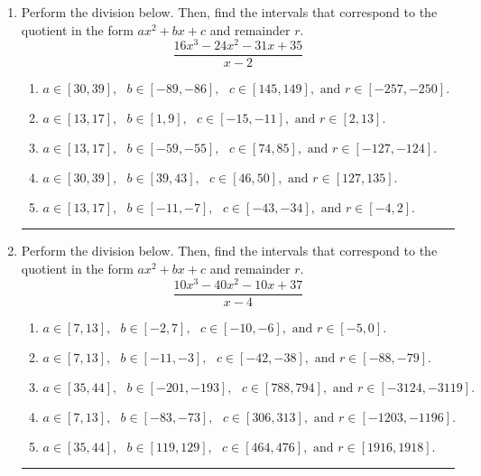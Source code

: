 \documentclass[14pt]{extbook}
\newcommand{\litem}[1]{\item#1\hspace*{-1cm}\rule{\textwidth}{0.4pt}}
\begin{document}
\begin{enumerate}
{\begin{enumerate}[label=\Alph*.]
\end{enumerate} }
\litem{
Perform the division below. Then, find the intervals that correspond to the quotient in the form $ax^2+bx+c$ and remainder $r$.\[ \frac{16x^{3} -24 x^{2} -31 x + 35}{x -2} \]\begin{enumerate}[label=\Alph*.]
\item \( a \in [30, 39], \text{   } b \in [-89, -86], \text{   } c \in [145, 149], \text{   and   } r \in [-257, -250]. \)
\item \( a \in [13, 17], \text{   } b \in [1, 9], \text{   } c \in [-15, -11], \text{   and   } r \in [2, 13]. \)
\item \( a \in [13, 17], \text{   } b \in [-59, -55], \text{   } c \in [74, 85], \text{   and   } r \in [-127, -124]. \)
\item \( a \in [30, 39], \text{   } b \in [39, 43], \text{   } c \in [46, 50], \text{   and   } r \in [127, 135]. \)
\item \( a \in [13, 17], \text{   } b \in [-11, -7], \text{   } c \in [-43, -34], \text{   and   } r \in [-4, 2]. \)

\end{enumerate} }
\litem{
Perform the division below. Then, find the intervals that correspond to the quotient in the form $ax^2+bx+c$ and remainder $r$.\[ \frac{10x^{3} -40 x^{2} -10 x + 37}{x -4} \]\begin{enumerate}[label=\Alph*.]
\item \( a \in [7, 13], \text{   } b \in [-2, 7], \text{   } c \in [-10, -6], \text{   and   } r \in [-5, 0]. \)
\item \( a \in [7, 13], \text{   } b \in [-11, -3], \text{   } c \in [-42, -38], \text{   and   } r \in [-88, -79]. \)
\item \( a \in [35, 44], \text{   } b \in [-201, -193], \text{   } c \in [788, 794], \text{   and   } r \in [-3124, -3119]. \)
\item \( a \in [7, 13], \text{   } b \in [-83, -73], \text{   } c \in [306, 313], \text{   and   } r \in [-1203, -1196]. \)
\item \( a \in [35, 44], \text{   } b \in [119, 129], \text{   } c \in [464, 476], \text{   and   } r \in [1916, 1918]. \)


\end{enumerate}}
\end{enumerate}
\end{document}
